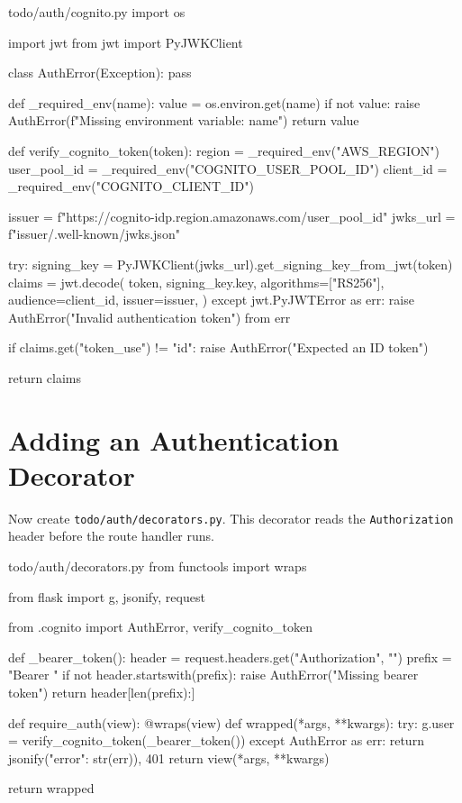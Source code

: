 \documentclass{csse4400}
\begin{document}
\begin{code}[language=python,numbers=none]{todo/auth/cognito.py}
import os

import jwt
from jwt import PyJWKClient


class AuthError(Exception):
    pass


def _required_env(name):
    value = os.environ.get(name)
    if not value:
        raise AuthError(f"Missing environment variable: {name}")
    return value


def verify_cognito_token(token):
    region = _required_env("AWS_REGION")
    user_pool_id = _required_env("COGNITO_USER_POOL_ID")
    client_id = _required_env("COGNITO_CLIENT_ID")

    issuer = f"https://cognito-idp.{region}.amazonaws.com/{user_pool_id}"
    jwks_url = f"{issuer}/.well-known/jwks.json"

    try:
        signing_key = PyJWKClient(jwks_url).get_signing_key_from_jwt(token)
        claims = jwt.decode(
            token,
            signing_key.key,
            algorithms=["RS256"],
            audience=client_id,
            issuer=issuer,
        )
    except jwt.PyJWTError as err:
        raise AuthError("Invalid authentication token") from err

    if claims.get("token_use") != "id":
        raise AuthError("Expected an ID token")

    return claims
\end{code}

\section{Adding an Authentication Decorator}

Now create \texttt{todo/auth/decorators.py}.
This decorator reads the \texttt{Authorization} header before the route handler runs.

\begin{code}[language=python,numbers=none]{todo/auth/decorators.py}
from functools import wraps

from flask import g, jsonify, request

from .cognito import AuthError, verify_cognito_token


def _bearer_token():
    header = request.headers.get("Authorization", "")
    prefix = "Bearer "
    if not header.startswith(prefix):
        raise AuthError("Missing bearer token")
    return header[len(prefix):]


def require_auth(view):
    @wraps(view)
    def wrapped(*args, **kwargs):
        try:
            g.user = verify_cognito_token(_bearer_token())
        except AuthError as err:
            return jsonify({"error": str(err)}), 401
        return view(*args, **kwargs)

    return wrapped
\end{code}
\end{document}
